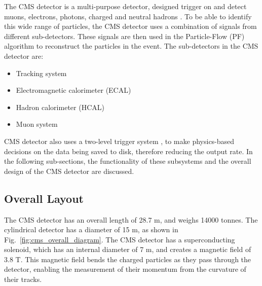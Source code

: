 The CMS detector is a multi-purpose detector, designed trigger on \cite{cms:l1_paper,cms:hlt_paper} and detect muons, electrons, photons, charged and 
neutral hadrons \cite{cms:elepho_paper,cms:muon_paper,cms:vertex_paper}. To be able to identify this wide range of particles, the CMS detector uses a combination of signals from different sub-detectors. These signals
are then used in the Particle-Flow (PF) algorithm to reconstruct the particles in the event. The sub-detectors in the CMS detector are:

\begin{itemize}
    \item Tracking system
    \item Electromagnetic calorimeter (ECAL)
    \item Hadron calorimeter (HCAL)
    \item Muon system
\end{itemize}

CMS detector also uses a two-level trigger system \cite{cms:l1_paper,cms:hlt_paper}, to make physics-based decisions on the data being saved to disk, 
therefore reducing the output rate. In the following sub-sections, the functionality of these subsystems and the overall design of the CMS detector are discussed.

\subsection{Overall Layout}

The CMS detector has an overall length of 28.7 m, and weighs 14000 tonnes. The cylindrical detector
has a diameter of 15 m, as shown in Fig.~\ref{fig:cms_overall_diagram}. The CMS detector has a superconducting solenoid,
which has an internal diameter of 7 m, and creates a magnetic field of 3.8 T. This magnetic field bends the charged particles
as they pass through the detector, enabling the measurement of their momentum from the curvature of their tracks.


